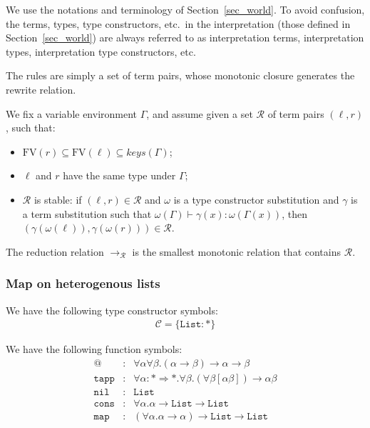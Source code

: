 \documentclass[runningheads,a4paper]{llncs}
\newcommand{\Rules}{\mathcal{R}}
\newcommand{\TypeConstructors}{\mathcal{C}}
\newcommand{\arr}[1]{\longrightarrow_{#1}}
\newcommand{\arrtype}{\rightarrow}
\newcommand{\arrkind}{\Rightarrow}
\newcommand{\FV}{\mathrm{FV}}
\newcommand{\List}{\mathtt{List}}
\newcommand{\proves}{\vdash}
\begin{document}
We use the notations and terminology of Section~\ref{sec_world}. To
avoid confusion, the terms, types, type constructors, etc.~in the
interpretation (those defined in Section~\ref{sec_world}) are always
referred to as interpretation terms, interpretation types,
interpretation type constructors, etc.

The rules are simply a set of term pairs, whose monotonic closure
generates the rewrite relation.

\begin{definition}\normalfont
We fix a variable environment $\Gamma$, and assume given a set
$\Rules$ of term pairs $(\ell,r)$, such that:
\begin{itemize}
\item $\FV(r) \subseteq \FV(\ell) \subseteq \mathit{keys}(\Gamma)$;
\item $\ell$ and $r$ have the same type under $\Gamma$;
\item $\Rules$ is stable: if $(\ell,r) \in \Rules$ and $\omega$ is a
  type constructor substitution and $\gamma$ is a term substitution
  such that $\omega(\Gamma) \proves \gamma(x) : \omega(\Gamma(x))$,
  then $(\gamma(\omega(\ell)),\gamma(\omega(r))) \in \Rules$.
\end{itemize}
The reduction relation $\arr{\Rules}$ is the smallest monotonic
relation that contains $\Rules$.
\end{definition}

\subsubsection{Map on heterogenous lists}

We have the following type constructor symbols:
\[
\begin{array}{c}
  \TypeConstructors = \{ \mathtt{List} : * \}
\end{array}
\]

We have the following function symbols:
\[
\begin{array}{rcl}
@ & : & \forall \alpha \forall \beta . (\alpha \arrtype \beta) \arrtype \alpha \arrtype \beta \\
\mathtt{tapp} & : & \forall \alpha : * \arrkind * . \forall \beta .
(\forall \beta [\alpha \beta]) \arrtype \alpha \beta \\
\mathtt{nil} & : & \List \\
\mathtt{cons} & : & \forall \alpha . \alpha \arrtype \List \arrtype \List \\
\mathtt{map} & : & (\forall \alpha . \alpha \arrtype \alpha) \arrtype \List \arrtype \List
\end{array}
\]
\end{document}
